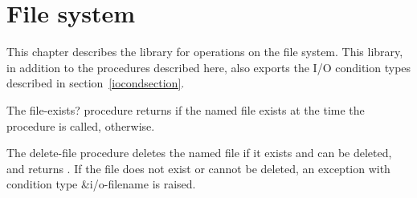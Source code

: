 \chapter{File system}
\label{filesystemchapter}

This chapter describes the  library for
operations on the file system.  This library, in addition to the
procedures described here, also exports the I/O condition types
described in section~\ref{iocondsection}.

\begin{entry}{%
}

  The {\cf file-exists?} procedure
returns \schtrue{} if the named file exists at the time the procedure
is called, \schfalse{} otherwise.
\end{entry}

\begin{entry}{%
}

  The {\cf delete-file} procedure
deletes the named file if it exists and can be deleted, and returns
\unspecifiedreturn.  If the file does not exist or cannot be deleted,
an exception with condition type {\cf\&i/o-filename} is raised.
\end{entry}


